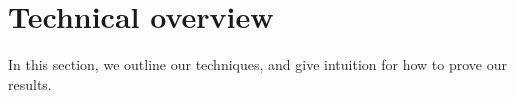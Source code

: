 \section{Technical overview}
In this section, we outline our techniques, and give intuition for how to prove our results.

